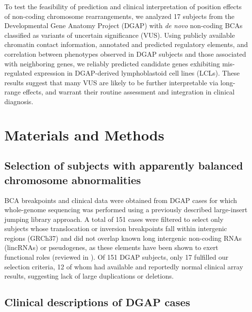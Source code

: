 \documentclass[a4paper,twoside=true,openright,parskip=full,chapterprefix=true,11pt,headings=normal,bibliography=totoc,listof=totoc,titlepage=on,captions=tableabove,draft=false]{scrreprt}
\theoremstyle{definition}
\theoremstyle{definition}
\theoremstyle{definition}
\theoremstyle{remark}
\begin{document}
To test the feasibility of prediction and clinical interpretation of
position effects of non-coding chromosome rearrangements, we analyzed 17
subjects from the Developmental Gene Anatomy Project
(DGAP)\citep{Higgins2008, Ligon2005, Kim2008, Lu2007, Redin2017} with
\emph{de novo} non-coding BCAs classified as variants of uncertain
significance (VUS). Using publicly available chromatin contact
information, annotated and predicted regulatory elements, and
correlation between phenotypes observed in DGAP subjects and those
associated with neighboring genes, we reliably predicted candidate genes
exhibiting mis-regulated expression in DGAP-derived lymphoblastoid cell
lines (LCLs). These results suggest that many VUS are likely to be
further interpretable via long-range effects, and warrant their routine
assessment and integration in clinical diagnosis.

\hypertarget{materials-and-methods}{%
\section{Materials and Methods}\label{materials-and-methods}}

\hypertarget{selection-of-subjects-with-apparently-balanced-chromosome-abnormalities}{%
\subsection{Selection of subjects with apparently balanced chromosome
abnormalities}\label{selection-of-subjects-with-apparently-balanced-chromosome-abnormalities}}

BCA breakpoints and clinical data were obtained from DGAP cases for
which whole-genome sequencing was performed using a previously described
large-insert jumping library
approach.\citep{Higgins2008, Ligon2005, Kim2008, Lu2007, Redin2017, Talkowski2011}
A total of 151 cases were filtered to select only subjects whose
translocation or inversion breakpoints fall within intergenic regions
(GRCh37) and did not overlap known long intergenic non-coding RNAs
(lincRNAs) or pseudogenes, as these elements have been shown to exert
functional roles (reviewed in \citep{Quinn2016}
\citep{Pink2011, Muro2010}). Of 151 DGAP subjects, only 17 fulfilled our
selection criteria, 12 of whom had available and reportedly normal
clinical array results, suggesting lack of large duplications or
deletions.

\hypertarget{clinical-descriptions-of-dgap-cases}{%
\subsection{Clinical descriptions of DGAP
cases}\label{clinical-descriptions-of-dgap-cases}}
\end{document}
